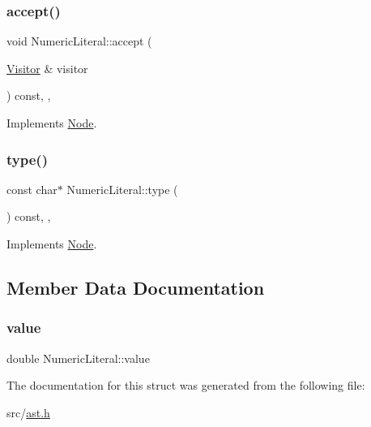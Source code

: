 \subsubsection{\texorpdfstring{accept()}{accept()}}
{\footnotesize\ttfamily void Numeric\+Literal\+::accept (\begin{DoxyParamCaption}\item[{\hyperlink{struct_visitor}{Visitor} \&}]{visitor }\end{DoxyParamCaption}) const\hspace{0.3cm}{\ttfamily [inline]}, {\ttfamily [override]}, {\ttfamily [virtual]}}



Implements \hyperlink{struct_node_a10bd7af968140bbf5fa461298a969c71}{Node}.

\mbox{\label{struct_numeric_literal_a685ec9d2678a8fb5df8b4ec1a580b762}} 
\subsubsection{\texorpdfstring{type()}{type()}}
{\footnotesize\ttfamily const char$\ast$ Numeric\+Literal\+::type (\begin{DoxyParamCaption}{ }\end{DoxyParamCaption}) const\hspace{0.3cm}{\ttfamily [inline]}, {\ttfamily [override]}, {\ttfamily [virtual]}}



Implements \hyperlink{struct_node_a82f29420d0a38efcc370352528e94e9b}{Node}.



\subsection{Member Data Documentation}
\mbox{\label{struct_numeric_literal_adeef869e11ca886648a0ccb723dc6639}} 
\subsubsection{\texorpdfstring{value}{value}}
{\footnotesize\ttfamily double Numeric\+Literal\+::value}



The documentation for this struct was generated from the following file\+:\begin{DoxyCompactItemize}
\item 
src/\hyperlink{ast_8h}{ast.\+h}\end{DoxyCompactItemize}
